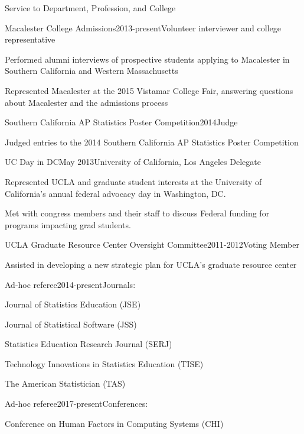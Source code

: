 \documentclass{resume} %
\begin{document}
\begin{rSection}{Service to Department, Profession, and College}
\begin{rSubsection}{Macalester College Admissions}{}{2013-present}{Volunteer interviewer and college representative}
\item Performed alumni interviews of prospective students applying to Macalester in Southern California and Western Massachusetts 
\item Represented Macalester at the 2015 Vistamar College Fair, answering questions about Macalester and the admissions process
\end{rSubsection}

\begin{rSubsection}{Southern California AP Statistics Poster Competition}{}{2014}{Judge}
\item Judged entries to the 2014 Southern California AP Statistics Poster Competition
\end{rSubsection}

\begin{rSubsection}{UC Day in DC}{}{May 2013}{University of California, Los Angeles Delegate}
\item Represented UCLA and graduate student interests at the University of California's annual federal advocacy day in Washington, DC. 
\item Met with congress members and their staff to discuss Federal funding for programs impacting grad students. 
\end{rSubsection}

\begin{rSubsection}{UCLA Graduate Resource Center Oversight Committee}{}{2011-2012}{Voting Member}
\item Assisted in developing a new strategic plan for UCLA's graduate resource center
\end{rSubsection}


\begin{rSubsection}{Ad-hoc referee}{}{2014-present}{Journals:}
\item Journal of Statistics Education (JSE)
\item Journal of Statistical Software (JSS)
\item Statistics Education Research Journal (SERJ)
\item Technology Innovations in Statistics Education (TISE)
\item The American Statistician (TAS)
\end{rSubsection}

\begin{rSubsection}{Ad-hoc referee}{}{2017-present}{Conferences: }
\item Conference on Human Factors in Computing Systems (CHI)
\end{rSubsection}

\end{rSection}
\end{document}
